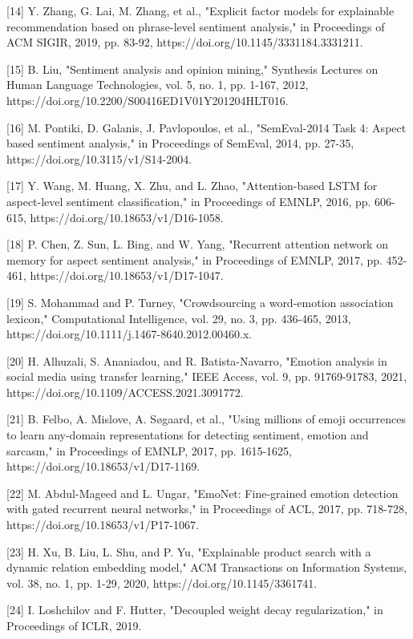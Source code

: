 \documentclass[11pt,a4paper]{article}
\begin{document}
[14] Y. Zhang, G. Lai, M. Zhang, et al., "Explicit factor models for explainable recommendation based on phrase-level sentiment analysis," in Proceedings of ACM SIGIR, 2019, pp. 83-92, https://doi.org/10.1145/3331184.3331211.

[15] B. Liu, "Sentiment analysis and opinion mining," Synthesis Lectures on Human Language Technologies, vol. 5, no. 1, pp. 1-167, 2012, https://doi.org/10.2200/S00416ED1V01Y201204HLT016.

[16] M. Pontiki, D. Galanis, J. Pavlopoulos, et al., "SemEval-2014 Task 4: Aspect based sentiment analysis," in Proceedings of SemEval, 2014, pp. 27-35, https://doi.org/10.3115/v1/S14-2004.

[17] Y. Wang, M. Huang, X. Zhu, and L. Zhao, "Attention-based LSTM for aspect-level sentiment classification," in Proceedings of EMNLP, 2016, pp. 606-615, https://doi.org/10.18653/v1/D16-1058.

[18] P. Chen, Z. Sun, L. Bing, and W. Yang, "Recurrent attention network on memory for aspect sentiment analysis," in Proceedings of EMNLP, 2017, pp. 452-461, https://doi.org/10.18653/v1/D17-1047.

[19] S. Mohammad and P. Turney, "Crowdsourcing a word-emotion association lexicon," Computational Intelligence, vol. 29, no. 3, pp. 436-465, 2013, https://doi.org/10.1111/j.1467-8640.2012.00460.x.

[20] H. Alhuzali, S. Ananiadou, and R. Batista-Navarro, "Emotion analysis in social media using transfer learning," IEEE Access, vol. 9, pp. 91769-91783, 2021, https://doi.org/10.1109/ACCESS.2021.3091772.

[21] B. Felbo, A. Mislove, A. Søgaard, et al., "Using millions of emoji occurrences to learn any-domain representations for detecting sentiment, emotion and sarcasm," in Proceedings of EMNLP, 2017, pp. 1615-1625, https://doi.org/10.18653/v1/D17-1169.

[22] M. Abdul-Mageed and L. Ungar, "EmoNet: Fine-grained emotion detection with gated recurrent neural networks," in Proceedings of ACL, 2017, pp. 718-728, https://doi.org/10.18653/v1/P17-1067.

[23] H. Xu, B. Liu, L. Shu, and P. Yu, "Explainable product search with a dynamic relation embedding model," ACM Transactions on Information Systems, vol. 38, no. 1, pp. 1-29, 2020, https://doi.org/10.1145/3361741.

[24] I. Loshchilov and F. Hutter, "Decoupled weight decay regularization," in Proceedings of ICLR, 2019.
\end{document}
